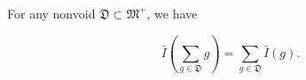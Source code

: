 For any nonvoid $\mathfrak{D} \subset \mathfrak{M}^+$, we have

$$\bar{I}\left(\sum_{g \in \mathfrak{D}} g\right) = \sum_{g \in \mathfrak{D}} \bar{I}(g).$$